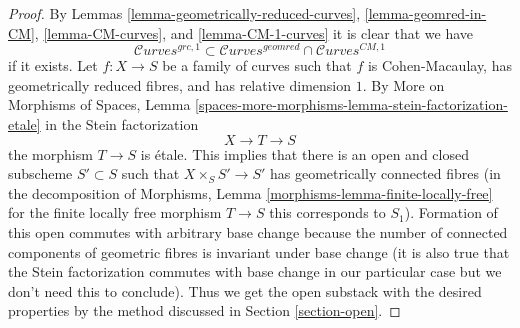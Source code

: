 \documentclass[10pt,a4paper]{amsart}
\theoremstyle{plain}
\theoremstyle{definition}
\theoremstyle{remark}
\numberwithin{equation}{subsection}
\def\Curvesstack{\mathcal{C}\!\mathit{urves}}
\begin{document}
\begin{proof}
By Lemmas \ref{lemma-geometrically-reduced-curves},
\ref{lemma-geomred-in-CM}, \ref{lemma-CM-curves}, and \ref{lemma-CM-1-curves}
it is clear that we have
$$
\Curvesstack^{grc, 1}
\subset
\Curvesstack^{geomred} \cap \Curvesstack^{CM, 1}
$$
if it exists. Let $f : X \to S$ be a family of curves such that $f$ is
Cohen-Macaulay, has geometrically reduced fibres, and
has relative dimension $1$. By
More on Morphisms of Spaces, Lemma
\ref{spaces-more-morphisms-lemma-stein-factorization-etale}
in the Stein factorization
$$
X \to T \to S
$$
the morphism $T \to S$ is \'etale. This implies that
there is an open and closed subscheme $S' \subset S$
such that $X \times_S S' \to S'$ has geometrically
connected fibres (in the decomposition of
Morphisms, Lemma \ref{morphisms-lemma-finite-locally-free}
for the finite locally free morphism $T \to S$
this corresponds to $S_1$).
Formation of this open commutes with arbitrary base change
because the number of connected components of geometric
fibres is invariant under base change (it is also true
that the Stein factorization commutes with base change
in our particular case but we don't need this to conclude).
Thus we get the open substack with the desired properties
by the method discussed in Section \ref{section-open}.
\end{proof}
\end{document}
